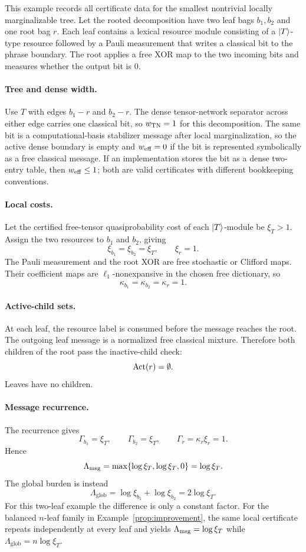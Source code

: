 This example records all certificate data for the smallest nontrivial locally marginalizable tree. Let the rooted decomposition have two leaf bags \(b_1,b_2\) and one root bag \(r\). Each leaf contains a lexical resource module consisting of a \(\left|T\right\rangle\)-type resource followed by a Pauli measurement that writes a classical bit to the phrase boundary. The root applies a free XOR map to the two incoming bits and measures whether the output bit is \(0\).

\paragraph{Tree and dense width.}
Use \(T\) with edges \(b_1-r\) and \(b_2-r\). The dense tensor-network separator across either edge carries one classical bit, so \(w_{\mathrm{TN}}=1\) for this decomposition. The same bit is a computational-basis stabilizer message after local marginalization, so the active dense boundary is empty and \(w_{\mathrm{eff}}=0\) if the bit is represented symbolically as a free classical message. If an implementation stores the bit as a dense two-entry table, then \(w_{\mathrm{eff}}\le 1\); both are valid certificates with different bookkeeping conventions.

\paragraph{Local costs.}
Let the certified free-tensor quasiprobability cost of each \(\left|T\right\rangle\)-module be \(\xi_T>1\). Assign the two resources to \(b_1\) and \(b_2\), giving
\[
\xi_{b_1}=\xi_{b_2}=\xi_T,\qquad \xi_r=1.
\]
The Pauli measurement and the root XOR are free stochastic or Clifford maps. Their coefficient maps are \(\ell_1\)-nonexpansive in the chosen free dictionary, so
\[
\kappa_{b_1}=\kappa_{b_2}=\kappa_r=1.
\]

\paragraph{Active-child sets.}
At each leaf, the resource label is consumed before the message reaches the root. The outgoing leaf message is a normalized free classical mixture. Therefore both children of the root pass the inactive-child check:
\[
\operatorname{Act}(r)=\emptyset.
\]
Leaves have no children.

\paragraph{Message recurrence.}
The recurrence gives
\[
\Gamma_{b_1}=\xi_T,\qquad
\Gamma_{b_2}=\xi_T,\qquad
\Gamma_r=\kappa_r\xi_r=1.
\]
Hence
\[
\Lambda_{\mathrm{msg}}=\max\{\log\xi_T,\log\xi_T,0\}=\log\xi_T.
\]
The global burden is instead
\[
\Lambda_{\mathrm{glob}}=\log\xi_{b_1}+\log\xi_{b_2}=2\log\xi_T.
\]
For this two-leaf example the difference is only a constant factor. For the balanced \(n\)-leaf family in Example~\ref{prop:improvement}, the same local certificate repeats independently at every leaf and yields \(\Lambda_{\mathrm{msg}}=\log\xi_T\) while \(\Lambda_{\mathrm{glob}}=n\log\xi_T\).


